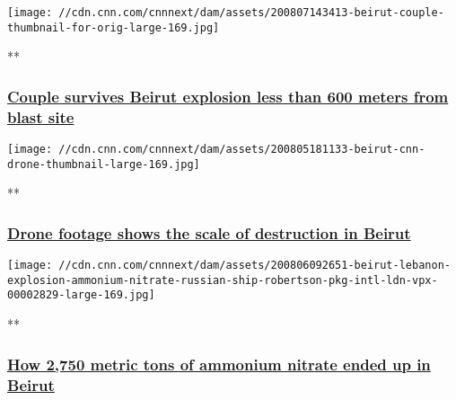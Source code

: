 \href{/videos/world/2020/08/07/beirut-explosion-survivors-lon-orig-bks.cnn/video/playlists/beirut-explosion/}{}

\texttt{[image: //cdn.cnn.com/cnnnext/dam/assets/200807143413-beirut-couple-thumbnail-for-orig-large-169.jpg]}

**

\hypertarget{couple-survives-beirut-explosion-less-than-600-meters-from-blast-site}{%
\subsubsection{\texorpdfstring{\href{/videos/world/2020/08/07/beirut-explosion-survivors-lon-orig-bks.cnn/video/playlists/beirut-explosion/}{Couple
survives Beirut explosion less than 600 meters from blast
site}}{Couple survives Beirut explosion less than 600 meters from blast site}}\label{couple-survives-beirut-explosion-less-than-600-meters-from-blast-site}}

\href{/videos/world/2020/08/05/beirut-explosion-lebanon-destruction-drone-video-lon-orig-bks.cnn/video/playlists/beirut-explosion/}{}

\texttt{[image: //cdn.cnn.com/cnnnext/dam/assets/200805181133-beirut-cnn-drone-thumbnail-large-169.jpg]}

**

\hypertarget{drone-footage-shows-the-scale-of-destruction-in-beirut}{%
\subsubsection{\texorpdfstring{\href{/videos/world/2020/08/05/beirut-explosion-lebanon-destruction-drone-video-lon-orig-bks.cnn/video/playlists/beirut-explosion/}{Drone
footage shows the scale of destruction in
Beirut}}{Drone footage shows the scale of destruction in Beirut}}\label{drone-footage-shows-the-scale-of-destruction-in-beirut}}

\href{/videos/world/2020/08/06/beirut-lebanon-explosion-ammonium-nitrate-russian-ship-robertson-pkg-intl-ldn-vpx.cnn/video/playlists/beirut-explosion/}{}

\texttt{[image: //cdn.cnn.com/cnnnext/dam/assets/200806092651-beirut-lebanon-explosion-ammonium-nitrate-russian-ship-robertson-pkg-intl-ldn-vpx-00002829-large-169.jpg]}

**

\hypertarget{how-2750-metric-tons-of-ammonium-nitrate-ended-up-in-beirut}{%
\subsubsection{\texorpdfstring{\href{/videos/world/2020/08/06/beirut-lebanon-explosion-ammonium-nitrate-russian-ship-robertson-pkg-intl-ldn-vpx.cnn/video/playlists/beirut-explosion/}{How
2,750 metric tons of ammonium nitrate ended up in
Beirut}}{How 2,750 metric tons of ammonium nitrate ended up in Beirut}}\label{how-2750-metric-tons-of-ammonium-nitrate-ended-up-in-beirut}}

